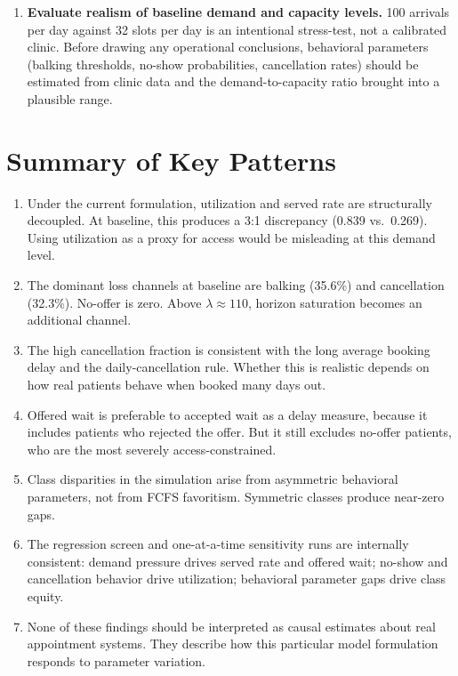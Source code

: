 \documentclass[11pt]{article}
\begin{document}
\begin{checkenv}
\begin{enumerate}
\item \textbf{Evaluate realism of baseline demand and capacity levels.}
100 arrivals per day against 32 slots per day is an intentional
stress-test, not a calibrated clinic. Before drawing any operational
conclusions, behavioral parameters (balking thresholds, no-show
probabilities, cancellation rates) should be estimated from clinic data
and the demand-to-capacity ratio brought into a plausible range.
\end{enumerate}
\end{checkenv}

\section{Summary of Key Patterns}
\label{sec:summary}

\begin{enumerate}
\item Under the current formulation, utilization and served rate are
structurally decoupled. At baseline, this produces a 3:1 discrepancy
(0.839 vs.\ 0.269). Using utilization as a proxy for access would be
misleading at this demand level.

\item The dominant loss channels at baseline are balking (35.6\%) and
cancellation (32.3\%). No-offer is zero. Above $\lambda \approx 110$,
horizon saturation becomes an additional channel.

\item The high cancellation fraction is consistent with the long average
booking delay and the daily-cancellation rule. Whether this is realistic
depends on how real patients behave when booked many days out.

\item Offered wait is preferable to accepted wait as a delay measure,
because it includes patients who rejected the offer. But it still excludes
no-offer patients, who are the most severely access-constrained.

\item Class disparities in the simulation arise from asymmetric behavioral
parameters, not from FCFS favoritism. Symmetric classes produce
near-zero gaps.

\item The regression screen and one-at-a-time sensitivity runs are
internally consistent: demand pressure drives served rate and offered
wait; no-show and cancellation behavior drive utilization; behavioral
parameter gaps drive class equity.

\item None of these findings should be interpreted as causal estimates
about real appointment systems. They describe how this particular model
formulation responds to parameter variation.
\end{enumerate}
\end{document}
